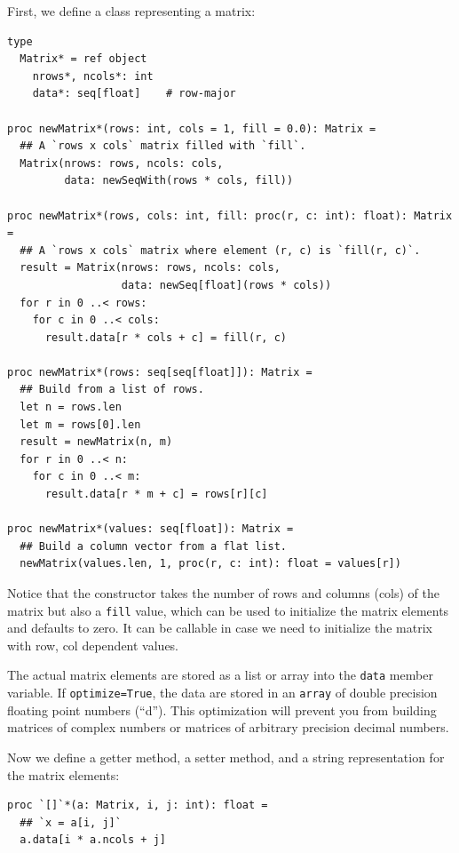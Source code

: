 \documentclass[justified, sixbynine]{tufte-book}
\def\ft{\small\tt}
\theoremstyle{plain}%
\newtheorem * {corollary}{Corollary}
\theoremstyle{definition}
\theoremstyle{remark}
\newtheorem * {remark}{Remark}
\newtheorem * {note}{Note}
\begin{document}
\begin{fullwidth}
First, we define a class representing a matrix:


\begin{lstlisting}[caption={in file: {\ft nlib/matrix.nim}}]
type
  Matrix* = ref object
    nrows*, ncols*: int
    data*: seq[float]    # row-major

proc newMatrix*(rows: int, cols = 1, fill = 0.0): Matrix =
  ## A `rows x cols` matrix filled with `fill`.
  Matrix(nrows: rows, ncols: cols,
         data: newSeqWith(rows * cols, fill))

proc newMatrix*(rows, cols: int, fill: proc(r, c: int): float): Matrix =
  ## A `rows x cols` matrix where element (r, c) is `fill(r, c)`.
  result = Matrix(nrows: rows, ncols: cols,
                  data: newSeq[float](rows * cols))
  for r in 0 ..< rows:
    for c in 0 ..< cols:
      result.data[r * cols + c] = fill(r, c)

proc newMatrix*(rows: seq[seq[float]]): Matrix =
  ## Build from a list of rows.
  let n = rows.len
  let m = rows[0].len
  result = newMatrix(n, m)
  for r in 0 ..< n:
    for c in 0 ..< m:
      result.data[r * m + c] = rows[r][c]

proc newMatrix*(values: seq[float]): Matrix =
  ## Build a column vector from a flat list.
  newMatrix(values.len, 1, proc(r, c: int): float = values[r])
\end{lstlisting}

Notice that the constructor takes the number of rows and columns (cols) of the matrix but also a {\ft fill} value, which can be used to initialize the matrix elements and defaults to zero. It can be callable in case we need to initialize the matrix with row, col dependent values.

The actual matrix elements are stored as a list or array into the {\ft data} member variable. If {\ft optimize=True}, the data are stored in an {\ft array} of double precision floating point numbers (``d''). This optimization will prevent you from building matrices of complex numbers or matrices of arbitrary precision decimal numbers.

Now we define a getter method, a setter method, and a string representation for the matrix elements:

\begin{lstlisting}[caption={in file: {\ft nlib/matrix.nim}}]
proc `[]`*(a: Matrix, i, j: int): float =
  ## `x = a[i, j]`
  a.data[i * a.ncols + j]


\end{lstlisting}
\end{fullwidth}
\end{document}
